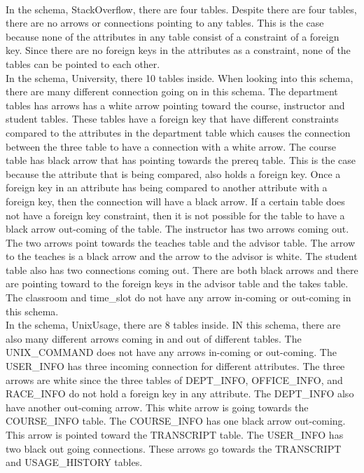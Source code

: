 \documentclass{article}
\begin{document}
\\
In the schema, StackOverflow, there are four tables. Despite there are four tables, there are no arrows or connections pointing to any tables. This is the case because none of the attributes in any table consist of a constraint of a foreign key. Since there are no foreign keys in the attributes as a constraint, none of the tables can be pointed to each other.
\\
In the schema, University, there 10 tables inside. When looking into this schema, there are many different connection going on in this schema. The department tables has arrows has a white arrow pointing toward the course, instructor and student tables. These tables have a foreign key that have different constraints compared to the attributes in the department table which causes the connection between the three table to have a connection with a white arrow. The course table has black arrow that has pointing towards the prereq table. This is the case because the attribute that is being compared, also holds a foreign key. Once a foreign key in an attribute has being compared to another attribute with a foreign key, then the connection will have a black arrow. If a certain table does not have a foreign key constraint, then it is not possible for the table to have a black arrow out-coming of the table. The instructor has two arrows coming out. The two arrows point towards the teaches table and the advisor table. The arrow to the teaches is a black arrow and the arrow to the advisor is white. The student table also has two connections coming out. There are both black arrows and there are pointing toward to the foreign keys in the advisor table and the takes table. The classroom and time\_slot do not have any  arrow in-coming or out-coming in this schema. 
\\
In the schema, UnixUsage, there are 8 tables inside. IN this schema, there are also many different arrows coming in and out of different tables. The UNIX\_COMMAND does not have any arrows in-coming or out-coming. The USER\_INFO has three incoming connection for different attributes. The three arrows are white since the three tables of DEPT\_INFO, OFFICE\_INFO, and RACE\_INFO do not hold a foreign key in any attribute.  The DEPT\_INFO also have another out-coming arrow. This white arrow is going towards the COURSE\_INFO table. The COURSE\_INFO has one black arrow out-coming. This arrow is pointed toward the TRANSCRIPT table. The USER\_INFO has two black out going connections. These arrows go towards the TRANSCRIPT and USAGE\_HISTORY tables.
\end{document}
